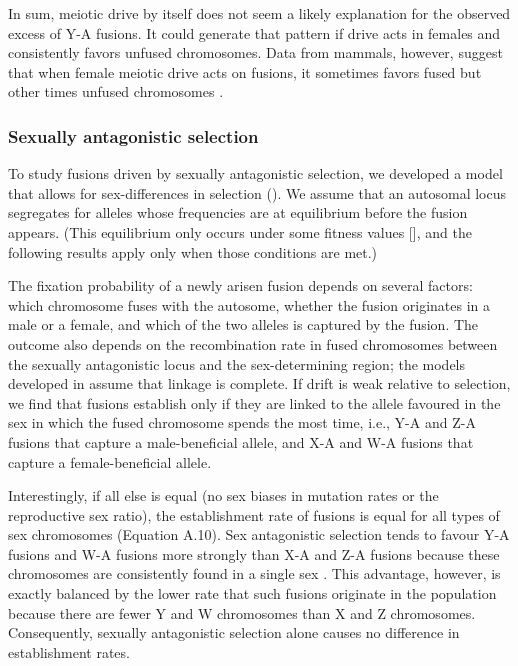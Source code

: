 In sum, meiotic drive by itself does not seem a likely explanation for the observed excess of Y-A fusions. It could generate that pattern if drive acts in females and consistently favors unfused chromosomes. Data from mammals, however, suggest that when female meiotic drive acts on fusions, it sometimes favors fused but other times unfused chromosomes \citep{Pardo2001a, Pardo2001b}.

\subsubsection{Sexually antagonistic selection} 

To study fusions driven by sexually antagonistic selection, we developed a model that allows for sex-differences in selection (). We assume that an autosomal locus segregates for alleles whose frequencies are at equilibrium before the fusion appears. (This equilibrium only occurs under some fitness values [\citealt{Clark1988}], and the following results apply only when those conditions are met.)

The fixation probability of a newly arisen fusion depends on several factors: which chromosome fuses with the autosome, whether the fusion originates in a male or a female, and which of the two alleles is captured by the fusion. The outcome also depends on the recombination rate in fused chromosomes between the sexually antagonistic locus and the sex-determining region; the models developed in  assume that linkage is complete. If drift is weak relative to selection, we find that fusions establish only if they are linked to the allele favoured in the sex in which the fused chromosome spends the most time, i.e., Y-A and Z-A fusions that capture a male-beneficial allele, and X-A and W-A fusions that capture a female-beneficial allele. 

Interestingly, if all else is equal (no sex biases in mutation rates or the reproductive sex ratio), the establishment rate of fusions is equal for all types of sex chromosomes (Equation A.10). Sex antagonistic selection tends to favour Y-A fusions and W-A fusions more strongly than X-A and Z-A fusions because these chromosomes are consistently found in a single sex \citep{Charlesworth1980}. This advantage, however, is exactly balanced by the lower rate that such fusions originate in the population because there are fewer Y and W chromosomes than X and Z chromosomes. Consequently, sexually antagonistic selection alone causes no difference in establishment rates.

